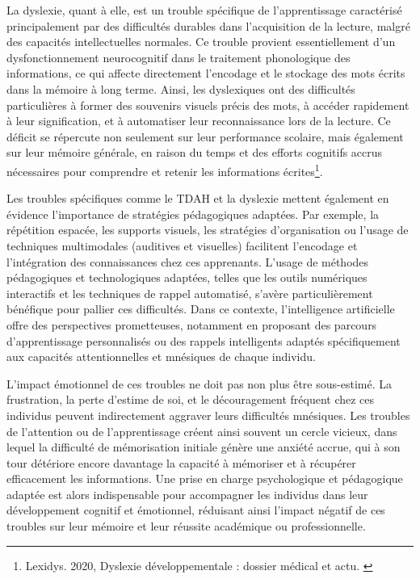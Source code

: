 \documentclass[11pt,a4paper]{report}
\begin{document}
La dyslexie, quant à elle, est un trouble spécifique de l’apprentissage caractérisé principalement par des difficultés durables dans l’acquisition de la lecture, malgré des capacités intellectuelles normales. Ce trouble provient essentiellement d’un dysfonctionnement neurocognitif dans le traitement phonologique des informations, ce qui affecte directement l’encodage et le stockage des mots écrits dans la mémoire à long terme. Ainsi, les dyslexiques ont des difficultés particulières à former des souvenirs visuels précis des mots, à accéder rapidement à leur signification, et à automatiser leur reconnaissance lors de la lecture. Ce déficit se répercute non seulement sur leur performance scolaire, mais également sur leur mémoire générale, en raison du temps et des efforts cognitifs accrus nécessaires pour comprendre et retenir les informations écrites\footnote{Lexidys. 2020, Dyslexie développementale : dossier médical et actu. \cite{lexidys}}.

Les troubles spécifiques comme le TDAH et la dyslexie mettent également en évidence l’importance de stratégies pédagogiques adaptées. Par exemple, la répétition espacée, les supports visuels, les stratégies d’organisation ou l’usage de techniques multimodales (auditives et visuelles) facilitent l’encodage et l’intégration des connaissances chez ces apprenants. L’usage de méthodes pédagogiques et technologiques adaptées, telles que les outils numériques interactifs et les techniques de rappel automatisé, s’avère particulièrement bénéfique pour pallier ces difficultés. Dans ce contexte, l'intelligence artificielle offre des perspectives prometteuses, notamment en proposant des parcours d'apprentissage personnalisés ou des rappels intelligents adaptés spécifiquement aux capacités attentionnelles et mnésiques de chaque individu.

L'impact émotionnel de ces troubles ne doit pas non plus être sous-estimé. La frustration, la perte d'estime de soi, et le découragement fréquent chez ces individus peuvent indirectement aggraver leurs difficultés mnésiques. Les troubles de l’attention ou de l’apprentissage créent ainsi souvent un cercle vicieux, dans lequel la difficulté de mémorisation initiale génère une anxiété accrue, qui à son tour détériore encore davantage la capacité à mémoriser et à récupérer efficacement les informations. Une prise en charge psychologique et pédagogique adaptée est alors indispensable pour accompagner les individus dans leur développement cognitif et émotionnel, réduisant ainsi l'impact négatif de ces troubles sur leur mémoire et leur réussite académique ou professionnelle.
\end{document}
